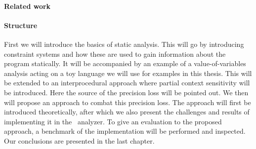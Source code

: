 
\paragraph{Related work}

\paragraph{Structure} 
First we will introduce the basics of static analysis. This will go by introducing constraint systems and how these are used to gain information about the program statically. It will be accompanied by an example of a value-of-variables analysis acting on a toy language we will use for examples in this thesis. This will be extended to an interprocedural approach where partial context sensitivity will be introduced. Here the source of the precision loss will be pointed out. We then will propose an approach to combat this precision loss. The approach will first be introduced theoretically, after which we also present the challenges and results of implementing it in the \gob\ analyzer. To give an evaluation to the proposed approach, a benchmark of the implementation will be performed and inspected. Our conclusions are presented in the last chapter.
